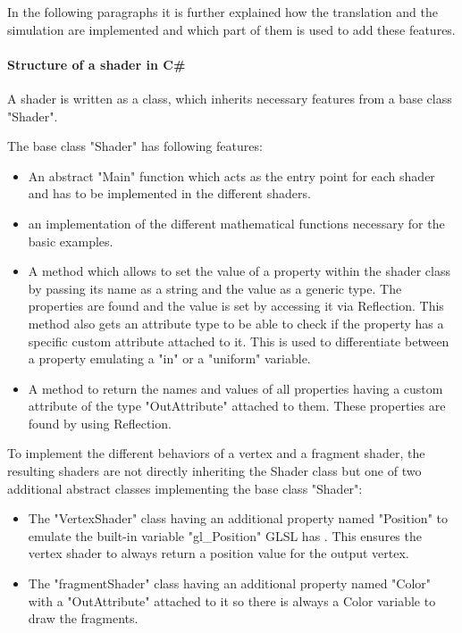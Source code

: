 In the following paragraphs it is further explained how the translation and the simulation are implemented and which part of them is used to add these features.

\paragraph{Structure of a shader in C\#}

A shader is written as a class, which inherits necessary features from a base class "Shader".

The base class "Shader" has following features:
\begin{itemize}
\item An abstract "Main" function which acts as the entry point for each shader and has to be implemented in the different shaders.
\item an implementation of the different mathematical functions necessary for the basic examples.
\item A method which allows to set the value of a property within the shader class by passing its name as a string and the value as a generic type. The properties are found and the value is set by accessing it via Reflection. This method also gets an attribute type to be able to check if the property has a specific custom attribute attached to it. This is used to differentiate between a property emulating a "in" or a "uniform" variable.
\item A method to return the names and values of all properties having a custom attribute of the type "OutAttribute" attached to them. These properties are found by using Reflection.
\end{itemize}

To implement the different behaviors of a vertex and a fragment shader, the resulting shaders are not directly inheriting the Shader class but one of two additional abstract classes implementing the base class "Shader":
\begin{itemize}
\item The "VertexShader" class having an additional property named "Position" to emulate the built-in variable "gl\_Position" GLSL has . This ensures the vertex shader to always return a position value for the output vertex.
\item The "fragmentShader" class having an additional property named "Color" with a "OutAttribute" attached to it so there is always a Color variable to draw the fragments.
\end{itemize}

